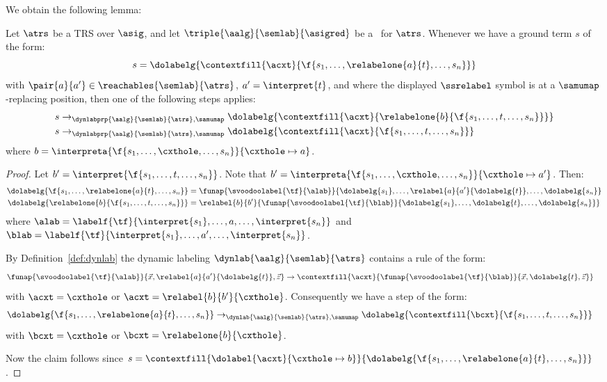 We obtain the following lemma: 
\begin{lemma}\label{lem:relabel}
  Let $\atrs$ be a TRS over $\asig$, 
  and let $\triple{\aalg}{\semlab}{\asigred}$ be a \clabeling\ for $\atrs$.
Whenever we have a ground term $s$ of the form:
  \[
    s = \dolabelg{\contextfill{\acxt}{\f{s_1,\ldots,\relabelone{a}{t},\ldots,s_n}}}
  \]
  with $\pair{a}{a'}\in\reachables{\semlab}{\atrs}$, $a' = \interpret{t}$,
  and where the displayed $\ssrelabel$ symbol is at a $\samumap$-replacing position,
  then one of the following steps applies:
  \begin{align}
    s
    & \to_{\dynlabprp{\aalg}{\semlab}{\atrs},\samumap} 
    \dolabelg{\contextfill{\acxt}{\relabelone{b}{\f{s_1,\ldots,t,\ldots,s_n}}}}
    \\
    s
    & \to_{\dynlabprp{\aalg}{\semlab}{\atrs},\samumap} 
    \dolabelg{\contextfill{\acxt}{\f{s_1,\ldots,t,\ldots,s_n}}}
  \end{align}
  where $b = \interpreta{\f{s_1,\ldots,\cxthole,\ldots,s_n}}{\cxthole\mapsto a}$.
\end{lemma}
\begin{proof}
  Let $b' = \interpret{\f{s_1,\ldots,t,\ldots,s_n}}$. 
  Note that $b' = \interpreta{\f{s_1,\ldots,\cxthole,\ldots,s_n}}{\cxthole\mapsto a'}$.
  Then:
\begin{align*}
    \dolabelg{\f{s_1,\ldots,\relabelone{a}{t},\ldots,s_{n}}} 
    & = \funap{\svoodoolabel{\tf}{\alab}}{\dolabelg{s_1},\ldots,\relabel{a}{a'}{\dolabelg{t}},\ldots,\dolabelg{s_{n}}} 
    \\
    \dolabelg{\relabelone{b}{\f{s_1,\ldots,t,\ldots,s_n}}} 
    & = \relabel{b}{b'}{\funap{\svoodoolabel{\tf}{\blab}}{\dolabelg{s_1},\ldots,\dolabelg{t},\ldots,\dolabelg{s_n}}}
  \end{align*}
  where $\alab = \labelf{\tf}{\interpret{s_1},\ldots,a,\ldots,\interpret{s_{n}}}$
  and $\blab = \labelf{\tf}{\interpret{s_1},\ldots,a',\ldots,\interpret{s_{n}}}$.

  By Definition~\ref{def:dynlab} the dynamic labeling $\dynlab{\aalg}{\semlab}{\atrs}$ contains a rule of the form:
  \begin{align*}
  \funap{\svoodoolabel{\tf}{\alab}}{\vec{x},\relabel{a}{a'}{\dolabelg{t}},\vec{z}}
  & \to 
  \contextfill{\acxt}{\funap{\svoodoolabel{\tf}{\blab}}{\vec{x},\dolabelg{t},\vec{z}}}
\end{align*}
  with $\acxt = \cxthole$ or $\acxt = \relabel{b}{b'}{\cxthole}$.
  Consequently we have a step of the form:
  \begin{align*}
    \dolabelg{\f{s_1,\ldots,\relabelone{a}{t},\ldots,s_n}} &\to_{\dynlab{\aalg}{\semlab}{\atrs},\samumap} \dolabelg{\contextfill{\bcxt}{\f{s_1,\ldots,t,\ldots,s_n}}}
\end{align*}
  with $\bcxt = \cxthole$ or $\bcxt = \relabelone{b}{\cxthole}$.

  Now the claim follows since $s = \contextfill{\dolabel{\acxt}{\cxthole \mapsto b}}{\dolabelg{\f{s_1,\ldots,\relabelone{a}{t},\ldots,s_n}}}$.
\end{proof}


